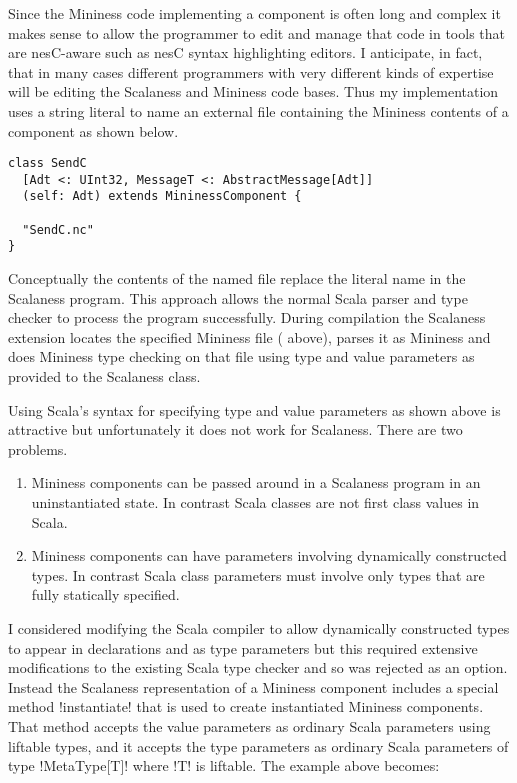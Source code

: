 Since the Mininess code implementing a component is often long and complex it makes sense to
allow the programmer to edit and manage that code in tools that are nesC-aware such as nesC
syntax highlighting editors. I anticipate, in fact, that in many cases different programmers
with very different kinds of expertise will be editing the Scalaness and Mininess code bases.
Thus my implementation uses a string literal to name an external file containing the Mininess
contents of a component as shown below.

\singlespace
\begin{lstlisting}[language=scalaness]
class SendC
  [Adt <: UInt32, MessageT <: AbstractMessage[Adt]]
  (self: Adt) extends MininessComponent {

  "SendC.nc"
}
\end{lstlisting}
\primaryspacing

Conceptually the contents of the named file replace the literal name in the Scalaness program.
This approach allows the normal Scala parser and type checker to process the program
successfully. During compilation the Scalaness extension locates the specified Mininess file
( above), parses it as Mininess and does Mininess type checking on that file
using type and value parameters as provided to the Scalaness class.

Using Scala's syntax for specifying type and value parameters as shown above is attractive but
unfortunately it does not work for Scalaness. There are two problems.
\begin{enumerate}
\item Mininess components can be passed around in a Scalaness program in an uninstantiated
  state. In contrast Scala classes are not first class values in Scala.
\item Mininess components can have parameters involving dynamically constructed types. In
  contrast Scala class parameters must involve only types that are fully statically specified.
\end{enumerate}

I considered modifying the Scala compiler to allow dynamically constructed types to appear in
declarations and as type parameters but this required extensive modifications to the existing
Scala type checker and so was rejected as an option. Instead the Scalaness representation of a
Mininess component includes a special method !instantiate! that is used to create instantiated
Mininess components. That method accepts the value parameters as ordinary Scala parameters using
liftable types, and it accepts the type parameters as ordinary Scala parameters of type
!MetaType[T]! where !T! is liftable. The example above becomes:

